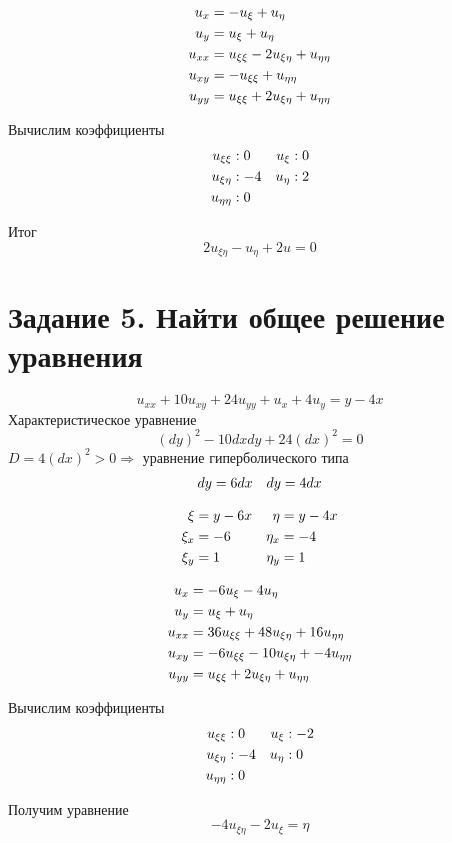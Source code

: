 \documentclass[12pt]{article}
\begin{document}
\begin{align}
u_x &= -u_\xi + u_\eta \notag \\
u_y &= u_\xi + u_\eta \notag \\
u_{xx} &= u_{\xi\xi} - 2u_{\xi\eta} + u_{\eta\eta} \notag \\
u_{xy} &= -u_{\xi\xi} + u_{\eta\eta} \notag \\
u_{yy} &= u_{\xi\xi} + 2u_{\xi\eta} + u_{\eta\eta} \notag
\end{align}

Вычислим коэффициенты
\begin{align}
    u_{\xi\xi} &: 0 &u_\xi &: 0 \notag \\
    u_{\xi\eta} &: -4 &u_\eta &: 2 \notag \\
    u_{\eta\eta} &: 0 \notag
\end{align}

Итог
$$2u_{\xi\eta} - u_\eta + 2u = 0$$

\section{Задание 5. Найти общее решение уравнения}
$$u_{xx} + 10u_{xy} + 24u_{yy} + u_x + 4u_y = y-4x$$
Характеристическое уравнение
$$(dy)^2 - 10dxdy + 24(dx)^2 = 0$$
$D = 4(dx)^2 > 0 \Rightarrow$ уравнение гиперболического типа
\begin{align}
dy &= 6dx &dy = 4dx \notag
\end{align}

\begin{align}
\xi &= y - 6x &\eta &= y-4x \notag \\
\xi_x &= -6 &\eta_x &= -4 \notag \\
\xi_y &= 1 &\eta_y &= 1 \notag
\end{align}

\begin{align}
    u_x &= -6u_\xi - 4u_\eta \notag \\
    u_y &= u_\xi + u_\eta \notag \\
    u_{xx} &= 36u_{\xi\xi} + 48u_{\xi\eta} + 16u_{\eta\eta} \notag \\
    u_{xy} &= -6u_{\xi\xi} - 10u_{\xi\eta} + -4u_{\eta\eta} \notag \\
    u_{yy} &= u_{\xi\xi} + 2u_{\xi\eta} + u_{\eta\eta} \notag
\end{align}

Вычислим коэффициенты
\begin{align}
u_{\xi\xi} &: 0 &u_\xi &: -2 \notag \\
u_{\xi\eta} &: -4 &u_\eta &: 0 \notag \\
u_{\eta\eta} &: 0 \notag
\end{align}

Получим уравнение
$$-4u_{\xi\eta} - 2u_\xi = \eta$$
\end{document}
